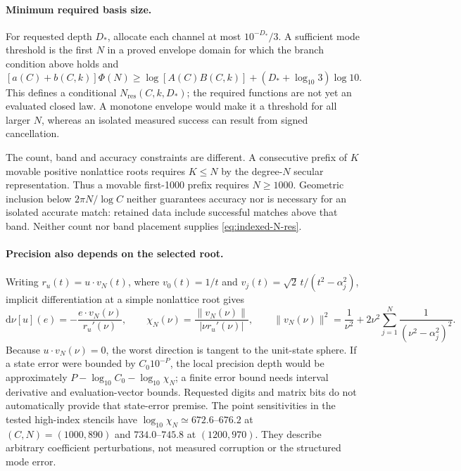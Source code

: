 \paragraph{Minimum required basis size.}
For requested depth $D_*$, allocate each channel at most
$10^{-D_*}/3$. A sufficient mode threshold is the first $N$ in a proved
envelope domain for which the branch condition above holds and
\begin{equation}\label{eq:indexed-N-res}
 [a(C)+b(C,k)]\Phi(N)
 \ge \log[A(C)B(C,k)]+(D_*+\log_{10}3)\log10.
\end{equation}
This defines a conditional $N_{\mathrm{res}}(C,k,D_*)$; the required
functions are not yet an evaluated closed law. A monotone envelope would
make it a threshold for all larger $N$, whereas an isolated measured
success can result from signed cancellation.

The count, band and accuracy constraints are different. A consecutive
prefix of $K$ movable positive nonlattice roots requires $K\le N$ by the
degree-$N$ secular representation. Thus a movable first-1000 prefix
requires $N\ge1000$. Geometric inclusion below
$2\pi N/\log C$ neither guarantees accuracy nor is necessary for an
isolated accurate match: retained data include successful matches above
that band. Neither count nor band placement supplies
\eqref{eq:indexed-N-res}.

\paragraph{Precision also depends on the selected root.}
Writing $r_u(t)=u\cdot v_N(t)$, where
$v_0(t)=1/t$ and $v_j(t)=\sqrt2\,t/(t^2-\alpha_j^2)$, implicit
differentiation at a simple nonlattice root gives
\begin{equation}\label{eq:indexed-root-condition}
 \mathrm d\nu[u](e)=-\frac{e\cdot v_N(\nu)}{r_u'(\nu)},\qquad
 \chi_N(\nu)=\frac{\|v_N(\nu)\|}{|\nu r_u'(\nu)|},\qquad
 \|v_N(\nu)\|^2=\frac1{\nu^2}
       +2\nu^2\sum_{j=1}^N\frac1{(\nu^2-\alpha_j^2)^2}.
\end{equation}
Because $u\cdot v_N(\nu)=0$, the worst direction is tangent to the
unit-state sphere. If a state error were bounded by $C_0 10^{-P}$,
the local precision depth would be approximately
$P-\log_{10}C_0-\log_{10}\chi_N$; a finite error bound needs interval
derivative and evaluation-vector bounds. Requested digits and matrix bits
do not automatically provide that state-error premise. The point
sensitivities in the tested high-index stencils have
$\log_{10}\chi_N\simeq672.6$--$676.2$ at $(C,N)=(1000,890)$ and
$734.0$--$745.8$ at $(1200,970)$. They describe arbitrary coefficient
perturbations, not measured corruption or the structured mode error.


